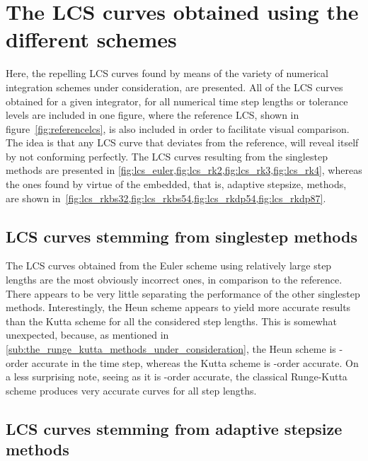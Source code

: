 \section{The LCS curves obtained using the different schemes}
\label{sec:the_lcs_curves_obtained_using_the_different_schemes}

Here, the repelling LCS curves found by means of the variety of
numerical integration schemes under consideration, are presented. All of the
LCS curves obtained for a given integrator, for all numerical time step lengths
or tolerance levels are included in one figure, where the reference LCS, shown
in figure~\ref{fig:referencelcs}, is also included in order to facilitate
visual comparison. The idea is that any LCS curve that deviates from the
reference, will reveal itself by not conforming perfectly. The LCS curves
resulting from the singlestep methods are presented in
\cref{fig:lcs_euler,fig:lcs_rk2,fig:lcs_rk3,fig:lcs_rk4}, whereas the ones
found by virtue of the embedded, that is, adaptive stepsize, methods, are
shown in~\cref{fig:lcs_rkbs32,fig:lcs_rkbs54,fig:lcs_rkdp54,fig:lcs_rkdp87}.

\subsection{LCS curves stemming from singlestep methods}
\label{sub:lcs_curves_stemming_from_singlestep_methods}








The LCS curves obtained from the Euler scheme using relatively large step
lengths are the most obviously incorrect ones, in comparison to the reference.
There appears to be very little separating the performance of the other
singlestep methods. Interestingly, the Heun scheme appears to yield more
accurate results than the Kutta scheme for all the considered step lengths.
This is somewhat unexpected, because, as mentioned in
\cref{sub:the_runge_kutta_methods_under_consideration}, the Heun scheme is
-order accurate in the time step, whereas the Kutta scheme is
-order accurate. On a less surprising note, seeing as it is -order
accurate, the classical Runge-Kutta scheme produces very accurate curves for
all step lengths.

\subsection{LCS curves stemming from adaptive stepsize methods}
\label{sub:lcs_curves_stemming_from_adaptive_stepsize_methods}

